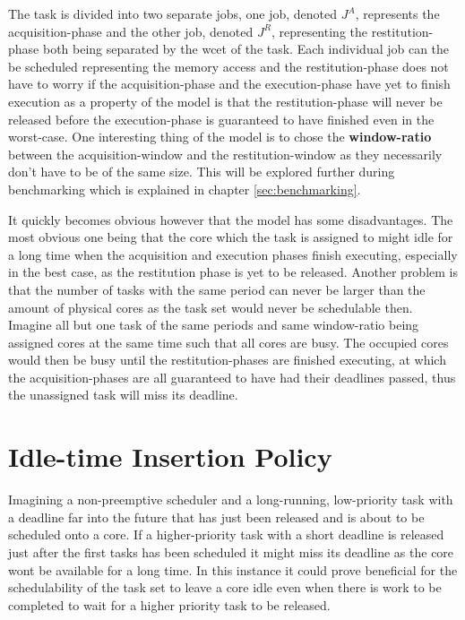 \documentclass{kththesis}
\begin{document}
The task is divided into two separate jobs, one job, denoted $J^{A}$, represents the
acquisition-phase and the other job, denoted $J^{R}$, representing the restitution-phase both being
separated by the \acrshort{wcet} of the task. Each individual job can the be scheduled representing
the memory access and the restitution-phase does not have to worry if the acquisition-phase and the
execution-phase have yet to finish execution as a property of the model is that the
restitution-phase will never be released before the execution-phase is guaranteed to have finished
even in the worst-case. One interesting thing of the model is to chose the \textbf{window-ratio}
between the acquisition-window and the restitution-window as they necessarily don't have to be of
the same size. This will be explored further during benchmarking which is explained in chapter
\ref{sec:benchmarking}.


It quickly becomes obvious however that the model has some disadvantages. The most obvious one being
that the core which the task is assigned to might idle for a long time when the acquisition and
execution phases finish executing, especially in the best case, as the restitution phase is yet to
be released. Another problem is that the number of tasks with the same period can never be larger
than the amount of physical cores as the task set would never be schedulable then. Imagine all but
one task of the same periods and same window-ratio being assigned cores at the same time such that
all cores are busy. The occupied cores would then be busy until the restitution-phases are finished
executing, at which the acquisition-phases are all guaranteed to have had their deadlines passed,
thus the unassigned task will miss its deadline.


\section{Idle-time Insertion Policy} \label{sec:iip}


Imagining a non-preemptive scheduler and a long-running, low-priority task with a deadline far into
the future that has just been released and is about to be scheduled onto a core. If a
higher-priority task with a short deadline is released just after the first tasks has been scheduled
it might miss its deadline as the core wont be available for a long time. In this instance it could
prove beneficial for the schedulability of the task set to leave a core idle even when there is work
to be completed to wait for a higher priority task to be released. 
\end{document}
